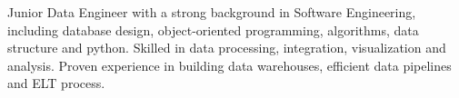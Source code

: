 \documentclass{minimal}
\begin{document}
\begin{multicols}{2}
    \columnbreak
\end{multicols}

\begin{multicols}{2}
        
    \columnbreak
    \begin{spacing}{1.5}
    Junior Data Engineer with a strong background in Software Engineering, including database design, object-oriented programming, algorithms, data structure and python. Skilled in data processing, integration, visualization and analysis. Proven experience in building data warehouses, efficient data pipelines and ELT process.
    \end{spacing}
\end{multicols}

\vspace{1em}
\setlength{\columnsep}{1cm}
\end{document}
